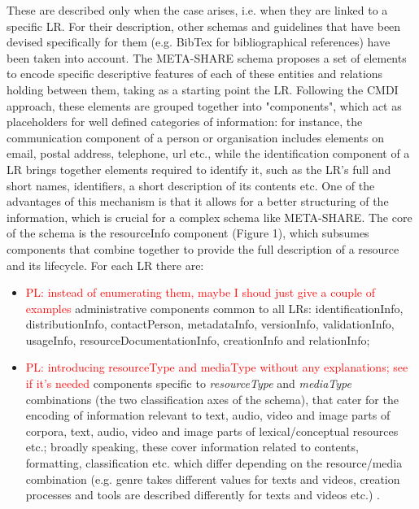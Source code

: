 \documentclass{llncs}
\begin{document}
These are described only when the case arises, i.e. when they are linked to a specific LR. For their description, other schemas and guidelines that have been devised specifically for them (e.g. BibTex for bibliographical references) have been taken into account.
The META-SHARE schema proposes a set of elements to encode specific descriptive features of each of these entities and relations holding between them, taking as a starting point the LR. Following the CMDI approach, these elements are grouped together into "components", which act as placeholders for well defined categories of information: for instance, the communication component of a person or organisation includes elements on email, postal address, telephone, url etc., while the identification component of a LR brings together elements required to identify it, such as the LR's full and short names, identifiers, a short description of its contents etc. One of the advantages of this mechanism is that it allows for a better structuring of the information, which is crucial for a complex schema like META-SHARE.
The core of the schema is the resourceInfo component (Figure 1), which subsumes components that combine together to provide the full description of a resource and its lifecycle. For each LR there are:
\begin{itemize}
\item \textcolor{red}{PL: instead of enumerating them, maybe I shoud just give a couple of examples} administrative components common to all LRs: identificationInfo, distributionInfo, contactPerson, metadataInfo, versionInfo, validationInfo, usageInfo, resourceDocumentationInfo, creationInfo and relationInfo;
\item \textcolor{red}{PL: introducing resourceType and mediaType without any explanations; see if it's needed} \color[rgb]{0,0,0}\color[rgb]{0,0,0} components specific to {\it resourceType} and {\it mediaType} combinations (the two classification axes of the schema), that cater for the encoding of information relevant to text, audio, video and image parts of corpora, text, audio, video and image parts of lexical/conceptual resources etc.; broadly speaking, these cover information related to contents, formatting, classification etc. which differ depending on the resource/media combination (e.g. genre takes different values for texts and videos, creation processes and tools are described differently for texts and videos etc.) .
\end{itemize}
\end{document}
